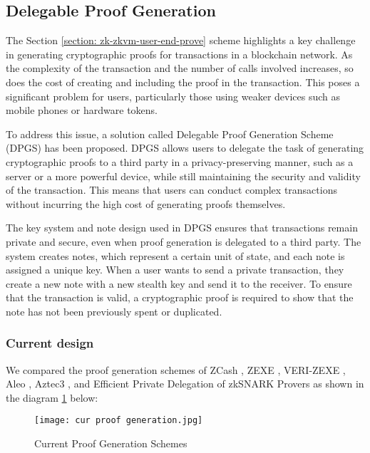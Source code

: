 \subsection{Delegable Proof Generation}\label{section: zk-zkvm-delegable-prove}

The Section \ref{section: zk-zkvm-user-end-prove} scheme highlights a key challenge in generating cryptographic proofs for transactions in a blockchain network. As the complexity of the transaction and the number of calls involved increases, so does the cost of creating and including the proof in the transaction. This poses a significant problem for users, particularly those using weaker devices such as mobile phones or hardware tokens.

To address this issue, a solution called Delegable Proof Generation Scheme (DPGS) has been proposed. DPGS allows users to delegate the task of generating cryptographic proofs to a third party in a privacy-preserving manner, such as a server or a more powerful device, while still maintaining the security and validity of the transaction. This means that users can conduct complex transactions without incurring the high cost of generating proofs themselves.

The key system and note design used in DPGS ensures that transactions remain private and secure, even when proof generation is delegated to a third party. The system creates notes, which represent a certain unit of state, and each note is assigned a unique key. When a user wants to send a private transaction, they create a new note with a new stealth key and send it to the receiver. To ensure that the transaction is valid, a cryptographic proof is required to show that the note has not been previously spent or duplicated.

\subsubsection{Current design}

We compared the proof generation schemes of ZCash \cite{website:zcash-nu5}, ZEXE \cite{cryptoeprint:2018/962}, VERI-ZEXE \cite{cryptoeprint:2022/802}, Aleo \cite{website:aleo-vm}, Aztec3 \cite{website:Aztec3}, and Efficient Private Delegation of zkSNARK Provers \cite{website:epdzp} as shown in the diagram \ref{fig:cur_proof_generation} below:
\begin{figure}[!ht]
    \centering
    \texttt{[image: cur proof generation.jpg]}
    \caption{Current Proof Generation Schemes}
    \label{fig:cur_proof_generation}
\end{figure}

